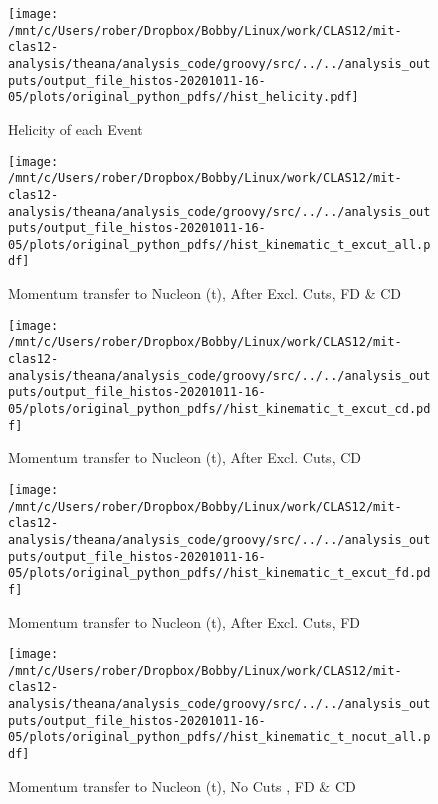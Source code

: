 \documentclass{article}
\begin{document}
\begin{landscape}
    \begin{figure}[h]
        \centering

        \texttt{[image: /mnt/c/Users/rober/Dropbox/Bobby/Linux/work/CLAS12/mit-clas12-analysis/theana/analysis\_code/groovy/src/../../analysis\_outputs/output\_file\_histos-20201011-16-05/plots/original\_python\_pdfs//hist\_helicity.pdf]}
        \captionsetup{textformat=empty,labelformat=blank}
        \caption{Helicity of each Event}
    \end{figure}
    \clearpage
    
    \begin{figure}[h]
        \centering

        \texttt{[image: /mnt/c/Users/rober/Dropbox/Bobby/Linux/work/CLAS12/mit-clas12-analysis/theana/analysis\_code/groovy/src/../../analysis\_outputs/output\_file\_histos-20201011-16-05/plots/original\_python\_pdfs//hist\_kinematic\_t\_excut\_all.pdf]}
        \captionsetup{textformat=empty,labelformat=blank}
        \caption{Momentum transfer to Nucleon (t), After Excl. Cuts, FD \& CD}
    \end{figure}
    \clearpage
    
    \begin{figure}[h]
        \centering

        \texttt{[image: /mnt/c/Users/rober/Dropbox/Bobby/Linux/work/CLAS12/mit-clas12-analysis/theana/analysis\_code/groovy/src/../../analysis\_outputs/output\_file\_histos-20201011-16-05/plots/original\_python\_pdfs//hist\_kinematic\_t\_excut\_cd.pdf]}
        \captionsetup{textformat=empty,labelformat=blank}
        \caption{Momentum transfer to Nucleon (t), After Excl. Cuts, CD}
    \end{figure}
    \clearpage
    
    \begin{figure}[h]
        \centering

        \texttt{[image: /mnt/c/Users/rober/Dropbox/Bobby/Linux/work/CLAS12/mit-clas12-analysis/theana/analysis\_code/groovy/src/../../analysis\_outputs/output\_file\_histos-20201011-16-05/plots/original\_python\_pdfs//hist\_kinematic\_t\_excut\_fd.pdf]}
        \captionsetup{textformat=empty,labelformat=blank}
        \caption{Momentum transfer to Nucleon (t), After Excl. Cuts, FD}
    \end{figure}
    \clearpage
    
    \begin{figure}[h]
        \centering

        \texttt{[image: /mnt/c/Users/rober/Dropbox/Bobby/Linux/work/CLAS12/mit-clas12-analysis/theana/analysis\_code/groovy/src/../../analysis\_outputs/output\_file\_histos-20201011-16-05/plots/original\_python\_pdfs//hist\_kinematic\_t\_nocut\_all.pdf]}
        \captionsetup{textformat=empty,labelformat=blank}
        \caption{Momentum transfer to Nucleon (t), No Cuts , FD \& CD}
    \end{figure}
    \clearpage
    

\end{landscape}
\end{document}
